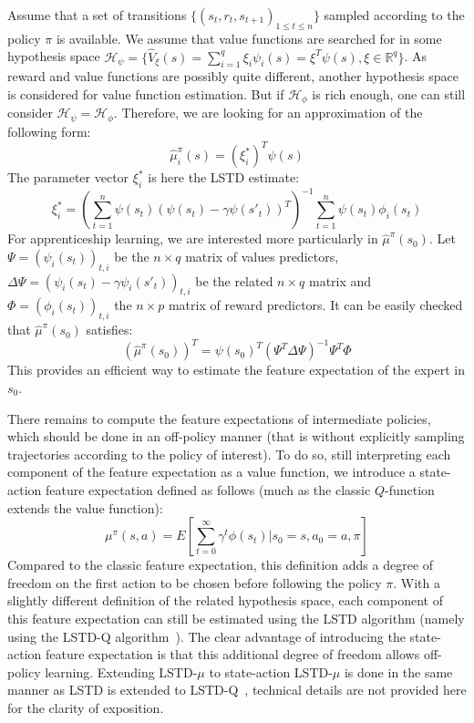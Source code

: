 \documentclass{jfpda2011}
\begin{document}
Assume that a set of transitions $\{(s_t,r_t,s_{t+1})_{1\leq t \leq
n}\}$ sampled according to the policy $\pi$ is available. We assume
that value functions are searched for in some  hypothesis space
$\mathcal{H}_\psi = \{ \hat{V}_\xi(s) = \sum\limits_{i=1}^q \xi_i \psi_i(s)
= \xi^T \psi(s), \xi\in\mathbb{R}^q\}$. As reward and value
functions are possibly quite different, another hypothesis space is
considered for value function estimation. But if $\mathcal{H}_\phi$
is rich enough, one can still consider
$\mathcal{H}_\psi=\mathcal{H}_\phi$. Therefore, we are looking for
an approximation of the following form:
\begin{equation}
  \hat{\mu}_i^\pi(s) = (\xi_i^*)^T \psi(s)
  \label{eqn:psi}
\end{equation}
The parameter vector $\xi_i^*$ is here the LSTD estimate:
\begin{equation}
  \xi_i^* = \left(\sum_{t=1}^n
  \psi(s_t)(\psi(s_t)-\gamma\psi(s'_{t}))^T\right)^{-1}
  \sum_{t=1}^n \psi(s_t) \phi_i(s_t)
\end{equation}
For apprenticeship learning, we are interested more particularly in
$\hat{\mu}^\pi(s_0)$. Let $\Psi = (\psi_i(s_t))_{t,i}$ be the
$n\times q$ matrix of values predictors, $\Delta\Psi = (\psi_i(s_t)
- \gamma\psi_i(s'_t))_{t,i}$ be the related $n\times q$ matrix and
$\Phi = (\phi_i(s_t))_{t,i}$ the $n\times p$ matrix of reward
predictors. It can be easily checked that $\hat{\mu}^\pi(s_0)$
satisfies:
\begin{equation}
  (\hat{\mu}^\pi(s_0))^T = \psi(s_0)^T (\Psi^T \Delta\Psi)^{-1} \Psi^T \Phi
\end{equation}
This provides an efficient way to estimate the feature expectation
of the expert in $s_0$.

There remains to compute the feature expectations of intermediate
policies, which should be done in an off-policy manner (that is
without explicitly sampling trajectories according to the policy of
interest). To do so, still interpreting each component of the
feature expectation as a value function, we introduce a state-action
feature expectation defined as follows (much as the classic
$Q$-function extends the value function):
\begin{equation}
  \mu^\pi(s,a) = E[\sum_{t=0}^\infty \gamma^t
  \phi(s_t)|s_0=s,a_0=a,\pi]
\end{equation}
Compared to the classic feature expectation, this definition adds a
degree of freedom on the first action to be chosen before following
the policy $\pi$. With a slightly different definition of the
related hypothesis space, each component of this feature expectation
can still be estimated using the LSTD algorithm (namely using the
LSTD-Q algorithm~\citep{lagoudakis2003least}). The clear advantage of
introducing the state-action feature expectation is that this
additional degree of freedom allows off-policy learning.
Extending LSTD-$\mu$ to state-action LSTD-$\mu$ is done in the same
manner as LSTD is extended to LSTD-Q~\citep{lagoudakis2003least},
technical details are not provided here for the clarity of
exposition.
\end{document}
